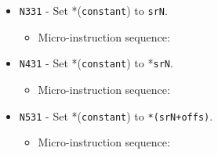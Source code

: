 \documentclass{article}
\def\pkptrout{\Verb|0202| - output *\Verb|pk| to data bus}
\def\tmpatoaddr{\Verb|2102| - output \Verb|tmpA| to addr bus}
\def\datatotmpa{\Verb|2402| - write to \Verb|tmpA| from data bus}
\def\incrementpk{\Verb|0502| - increment \Verb|pk|}
\def\regtodata#1{\Verb|#1003| - output \Verb|r#1| to data bus}
\def\regptodata#1{\Verb|#1203| - output *\Verb|r#1| to data bus}
\def\writeRAM{\Verb|0004| - write data bus to *(addr bus)}
\def\echodataaddr{\Verb|0021| - echo data bus to addr bus for 3 cycles}
\def\echodatalong{\Verb|0025| - echo data bus to itself for 3 cycles}
\def\done{\Verb|fffe| - end instruction}
\begin{document}
\begin{itemize}
    \item \Verb|N331| - Set *(\Verb|constant|) to \Verb|srN|.
    \begin{itemize}
        \item Micro-instruction sequence:
    \end{itemize}

    \item \Verb|N431| - Set *(\Verb|constant|) to *\Verb|srN|.
    \begin{itemize}
        \item Micro-instruction sequence:
    \end{itemize}
    
    \item \Verb|N531| - Set *(\Verb|constant|) to \Verb|*(srN+offs)|.
    \begin{itemize}
        \item Micro-instruction sequence:
    \end{itemize}
    

\end{itemize}
\end{document}

